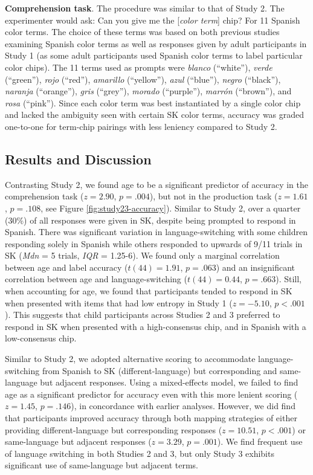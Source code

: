 \documentclass[
  english,
  ,man,floatsintext]{apa6}
\begin{document}
\textbf{Comprehension task}. The procedure was similar to that of Study 2. The experimenter would ask: Can you give me the {[}\emph{color term}{]} chip? For 11 Spanish color terms. The choice of these terms was based on both previous studies examining Spanish color terms as well as responses given by adult participants in Study 1 (as some adult participants used Spanish color terms to label particular color chips). The 11 terms used as prompts were \emph{blanco} (\enquote{white}), \emph{verde} (\enquote{green}), \emph{rojo} (\enquote{red}), \emph{amarillo} (\enquote{yellow}), \emph{azul} (\enquote{blue}), \emph{negro} (\enquote{black}), \emph{naranja} (\enquote{orange}), \emph{gris} (\enquote{grey}), \emph{morado} (\enquote{purple}), \emph{marrón} (\enquote{brown}), and \emph{rosa} (\enquote{pink}). Since each color term was best instantiated by a single color chip and lacked the ambiguity seen with certain SK color terms, accuracy was graded one-to-one for term-chip pairings with less leniency compared to Study 2.

\hypertarget{results-and-discussion-2}{%
\subsection{Results and Discussion}\label{results-and-discussion-2}}

Contrasting Study 2, we found age to be a significant predictor of accuracy in the comprehension task (\(z = 2.90\), \(p = .004\)), but not in the production task (\(z = 1.61\), \(p = .108\), see Figure \ref{fig:study23-accuracy}). Similar to Study 2, over a quarter (30\%) of all responses were given in SK, despite being prompted to respond in Spanish. There was significant variation in language-switching with some children responding solely in Spanish while others responded to upwards of 9/11 trials in SK (\emph{Mdn} = 5 trials, \emph{IQR} = 1.25-6). We found only a marginal correlation between age and label accuracy (\(t(44) = 1.91\), \(p = .063\)) and an insignificant correlation between age and language-switching (\(t(44) = 0.44\), \(p = .663\)). Still, when accounting for age, we found that participants tended to respond in SK when presented with items that had low entropy in Study 1 (\(z = -5.10\), \(p < .001\)). This suggests that child participants across Studies 2 and 3 preferred to respond in SK when presented with a high-consensus chip, and in Spanish with a low-consensus chip.

Similar to Study 2, we adopted alternative scoring to accommodate language-switching from Spanish to SK (different-language) but corresponding and same-language but adjacent responses. Using a mixed-effects model, we failed to find age as a significant predictor for accuracy even with this more lenient scoring (\(z = 1.45\), \(p = .146\)), in concordance with earlier analyses. However, we did find that participants improved accuracy through both mapping strategies of either providing different-language but corresponding responses (\(z = 10.51\), \(p < .001\)) or same-language but adjacent responses (\(z = 3.29\), \(p = .001\)). We find frequent use of language switching in both Studies 2 and 3, but only Study 3 exhibits significant use of same-language but adjacent terms.
\end{document}
